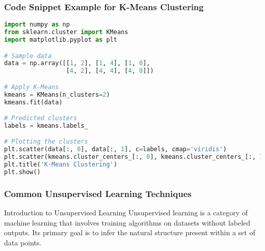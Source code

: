 \documentclass{beamer}
\begin{document}
\begin{frame}[fragile]
    \frametitle{Code Snippet Example for K-Means Clustering}
    \begin{lstlisting}[language=Python]
import numpy as np
from sklearn.cluster import KMeans
import matplotlib.pyplot as plt

# Sample data
data = np.array([[1, 2], [1, 4], [1, 0],
                 [4, 2], [4, 4], [4, 0]])

# Apply K-Means
kmeans = KMeans(n_clusters=2)
kmeans.fit(data)

# Predicted clusters
labels = kmeans.labels_

# Plotting the clusters
plt.scatter(data[:, 0], data[:, 1], c=labels, cmap='viridis')
plt.scatter(kmeans.cluster_centers_[:, 0], kmeans.cluster_centers_[:, 1], s=300, c='red')
plt.title('K-Means Clustering')
plt.show()
    \end{lstlisting}
\end{frame}

\begin{frame}[fragile]
    \frametitle{Common Unsupervised Learning Techniques}
    \begin{block}{Introduction to Unsupervised Learning}
        Unsupervised learning is a category of machine learning that involves training algorithms on datasets without labeled outputs. 
        Its primary goal is to infer the natural structure present within a set of data points.
    \end{block}
\end{frame}
\end{document}
